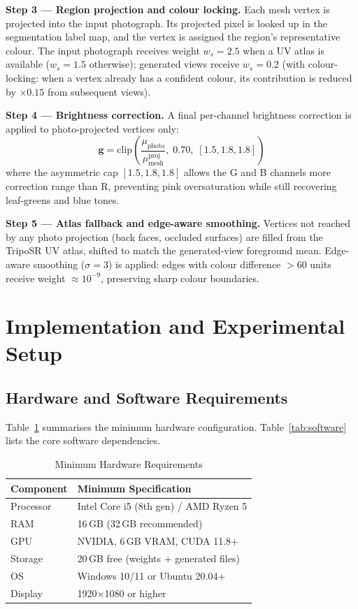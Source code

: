 ﻿\documentclass[conference]{IEEEtran}
\begin{document}
\textbf{Step 3 — Region projection and colour locking.}
Each mesh vertex is projected into the input photograph. Its projected pixel is looked up in the segmentation
label map, and the vertex is assigned the region's representative colour. The input photograph receives weight $w_s = 2.5$ when a UV atlas is available ($w_s = 1.5$ otherwise); generated views receive $w_s = 0.2$ (with colour-locking: when a vertex already
has a confident colour, its contribution is reduced by $\times 0.15$ from subsequent views).

\textbf{Step 4 — Brightness correction.}
A final per-channel brightness correction is applied to photo-projected vertices only:
\begin{equation}
\mathbf{g} = \mathrm{clip}\!\left(\frac{\mu_{\text{photo}}}{\mu_{\text{mesh}}^{\text{proj}}},\; 0.70,\; [1.5, 1.8, 1.8]\right)
\end{equation}
where the asymmetric cap $[1.5, 1.8, 1.8]$ allows the G and B channels more correction range than R, preventing
pink oversaturation while still recovering leaf-greens and blue tones.

\textbf{Step 5 — Atlas fallback and edge-aware smoothing.}
Vertices not reached by any photo projection (back faces, occluded surfaces) are filled from the TripoSR UV
atlas, shifted to match the generated-view foreground mean. Edge-aware smoothing ($\sigma = 3$) is applied:
edges with colour difference $> 60$ units receive weight $\approx 10^{-9}$, preserving sharp colour boundaries.

\section{Implementation and Experimental Setup}

\subsection{Hardware and Software Requirements}

Table~\ref{tab:hardware} summarises the minimum hardware configuration. Table~\ref{tab:software} lists the
core software dependencies.

\begin{table}[htbp]
\caption{Minimum Hardware Requirements}
\label{tab:hardware}
\centering
\begin{tabular}{ll}
\toprule
\textbf{Component} & \textbf{Minimum Specification} \\
\midrule
Processor & Intel Core i5 (8th gen) / AMD Ryzen 5 \\
RAM & 16\,GB (32\,GB recommended) \\
GPU & NVIDIA, 6\,GB VRAM, CUDA 11.8+ \\
Storage & 20\,GB free (weights + generated files) \\
OS & Windows 10/11 or Ubuntu 20.04+ \\
Display & 1920$\times$1080 or higher \\
\bottomrule
\end{tabular}
\end{table}
\end{document}
